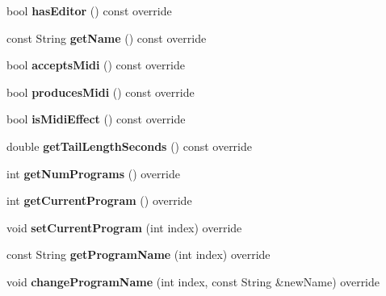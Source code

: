 \begin{DoxyCompactItemize}
bool {\bfseries has\+Editor} () const override
\item 
\mbox{\label{class_plume_processor_ae94a4572fc37682092a145a62606b0bb}} 
const String {\bfseries get\+Name} () const override
\item 
\mbox{\label{class_plume_processor_a9dfd593b13b864f6d646600453b983bc}} 
bool {\bfseries accepts\+Midi} () const override
\item 
\mbox{\label{class_plume_processor_af53ebafbc9dbb53b5f417f06814e5753}} 
bool {\bfseries produces\+Midi} () const override
\item 
\mbox{\label{class_plume_processor_a92025e451d25175363b38f5fa1f99e8a}} 
bool {\bfseries is\+Midi\+Effect} () const override
\item 
\mbox{\label{class_plume_processor_ae85b56bdc30fc398bdc3e6a9b40c733a}} 
double {\bfseries get\+Tail\+Length\+Seconds} () const override
\item 
\mbox{\label{class_plume_processor_acc125f472abf81a2273f7aafe75302ec}} 
int {\bfseries get\+Num\+Programs} () override
\item 
\mbox{\label{class_plume_processor_a5bf89a890c12f02dd352a523c1a88f64}} 
int {\bfseries get\+Current\+Program} () override
\item 
\mbox{\label{class_plume_processor_a909a5331670eb7b2e722498e755bf890}} 
void {\bfseries set\+Current\+Program} (int index) override
\item 
\mbox{\label{class_plume_processor_ac16c6d0751467defa92a523ffb6af939}} 
const String {\bfseries get\+Program\+Name} (int index) override
\item 
\mbox{\label{class_plume_processor_a28ce5f77d4e4871ff57ade3e730b5cd9}} 
void {\bfseries change\+Program\+Name} (int index, const String \&new\+Name) override
\item 
\mbox{\label{class_plume_processor_ae012dd41a5ac75aea7d2ae863840c7ea}} 

\end{DoxyCompactItemize}
